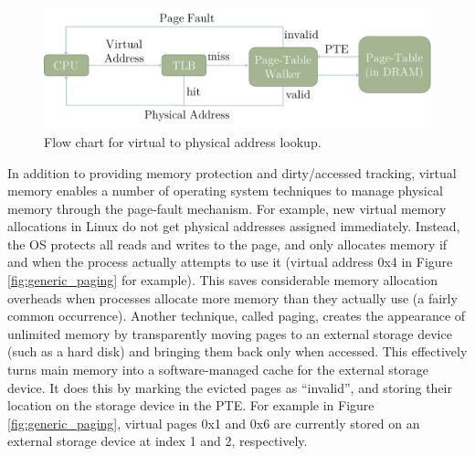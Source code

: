 \begin{figure}[h]
    \centering
    \includegraphics[width=0.9\columnwidth]{figs/generic_paging.pdf}
    \vspace{-5mm}
    \caption{Flow chart for virtual to physical address lookup.}
    \label{fig:generic_paging_flow}
\end{figure}

In addition to providing memory protection and dirty/accessed tracking, virtual
memory enables a number of operating system techniques to manage physical
memory through the page-fault mechanism. For example, new virtual memory
allocations in Linux do not get physical addresses assigned immediately.
Instead, the OS protects all reads and writes to the page, and only allocates
memory if and when the process actually attempts to use it (virtual address 0x4
in Figure \ref{fig:generic_paging} for example). This saves considerable memory
allocation overheads when processes allocate more memory than they actually use
(a fairly common occurrence). Another technique, called paging, creates the
appearance of unlimited memory by transparently moving pages to an external
storage device (such as a hard disk) and bringing them back only when accessed.
This effectively turns main memory into a software-managed cache for the
external storage device. It does this by marking the evicted pages as
``invalid'', and storing their location on the storage device in the PTE. For
example in Figure \ref{fig:generic_paging}, virtual pages 0x1 and 0x6 are
currently stored on an external storage device at index 1 and 2, respectively.
